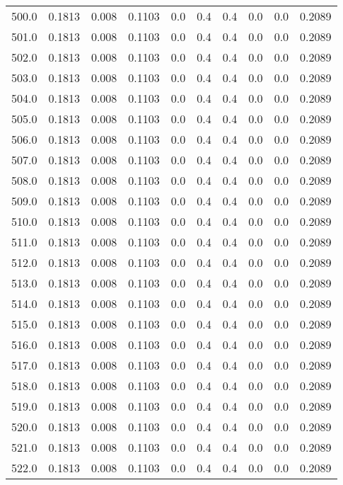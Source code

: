 \begin{longtable}{lrrrrrrrrr}
500.0 & 0.1813 & 0.008 & 0.1103 & 0.0 & 0.4 & 0.4 & 0.0 & 0.0 & 0.2089 \\
501.0 & 0.1813 & 0.008 & 0.1103 & 0.0 & 0.4 & 0.4 & 0.0 & 0.0 & 0.2089 \\
502.0 & 0.1813 & 0.008 & 0.1103 & 0.0 & 0.4 & 0.4 & 0.0 & 0.0 & 0.2089 \\
503.0 & 0.1813 & 0.008 & 0.1103 & 0.0 & 0.4 & 0.4 & 0.0 & 0.0 & 0.2089 \\
504.0 & 0.1813 & 0.008 & 0.1103 & 0.0 & 0.4 & 0.4 & 0.0 & 0.0 & 0.2089 \\
505.0 & 0.1813 & 0.008 & 0.1103 & 0.0 & 0.4 & 0.4 & 0.0 & 0.0 & 0.2089 \\
506.0 & 0.1813 & 0.008 & 0.1103 & 0.0 & 0.4 & 0.4 & 0.0 & 0.0 & 0.2089 \\
507.0 & 0.1813 & 0.008 & 0.1103 & 0.0 & 0.4 & 0.4 & 0.0 & 0.0 & 0.2089 \\
508.0 & 0.1813 & 0.008 & 0.1103 & 0.0 & 0.4 & 0.4 & 0.0 & 0.0 & 0.2089 \\
509.0 & 0.1813 & 0.008 & 0.1103 & 0.0 & 0.4 & 0.4 & 0.0 & 0.0 & 0.2089 \\
510.0 & 0.1813 & 0.008 & 0.1103 & 0.0 & 0.4 & 0.4 & 0.0 & 0.0 & 0.2089 \\
511.0 & 0.1813 & 0.008 & 0.1103 & 0.0 & 0.4 & 0.4 & 0.0 & 0.0 & 0.2089 \\
512.0 & 0.1813 & 0.008 & 0.1103 & 0.0 & 0.4 & 0.4 & 0.0 & 0.0 & 0.2089 \\
513.0 & 0.1813 & 0.008 & 0.1103 & 0.0 & 0.4 & 0.4 & 0.0 & 0.0 & 0.2089 \\
514.0 & 0.1813 & 0.008 & 0.1103 & 0.0 & 0.4 & 0.4 & 0.0 & 0.0 & 0.2089 \\
515.0 & 0.1813 & 0.008 & 0.1103 & 0.0 & 0.4 & 0.4 & 0.0 & 0.0 & 0.2089 \\
516.0 & 0.1813 & 0.008 & 0.1103 & 0.0 & 0.4 & 0.4 & 0.0 & 0.0 & 0.2089 \\
517.0 & 0.1813 & 0.008 & 0.1103 & 0.0 & 0.4 & 0.4 & 0.0 & 0.0 & 0.2089 \\
518.0 & 0.1813 & 0.008 & 0.1103 & 0.0 & 0.4 & 0.4 & 0.0 & 0.0 & 0.2089 \\
519.0 & 0.1813 & 0.008 & 0.1103 & 0.0 & 0.4 & 0.4 & 0.0 & 0.0 & 0.2089 \\
520.0 & 0.1813 & 0.008 & 0.1103 & 0.0 & 0.4 & 0.4 & 0.0 & 0.0 & 0.2089 \\
521.0 & 0.1813 & 0.008 & 0.1103 & 0.0 & 0.4 & 0.4 & 0.0 & 0.0 & 0.2089 \\
522.0 & 0.1813 & 0.008 & 0.1103 & 0.0 & 0.4 & 0.4 & 0.0 & 0.0 & 0.2089 \\

\end{longtable}

